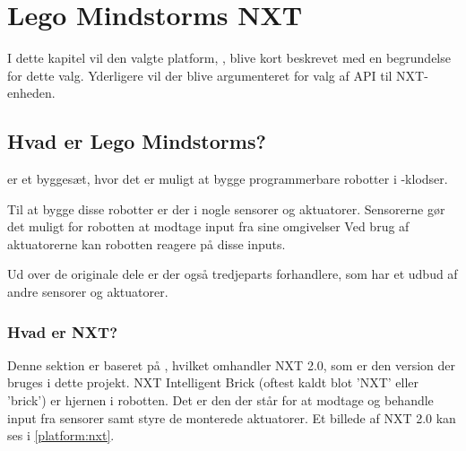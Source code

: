 
\section{Lego Mindstorms NXT}\label{lego:mindstorms-nxt}
I dette kapitel vil den valgte platform, \legoms, blive kort beskrevet med en begrundelse for dette valg.
Yderligere vil der blive argumenteret for valg af API til NXT-enheden.

\subsection{Hvad er Lego Mindstorms?}
\legoms er et byggesæt, hvor det er muligt at bygge programmerbare robotter i \lego-klodser.

Til at bygge disse robotter er der i \legoms nogle sensorer og aktuatorer. Sensorerne gør det muligt for robotten at modtage input fra sine omgivelser
Ved brug af aktuatorerne kan robotten reagere på disse inputs.

Ud over de originale \lego dele er der også tredjeparts forhandlere, som har et udbud af andre sensorer og aktuatorer. 

\subsubsection{Hvad er NXT?}
Denne sektion er baseret på \cite{nxt}, hvilket omhandler NXT 2.0, som er den version der bruges i dette projekt.
NXT Intelligent Brick (oftest kaldt blot 'NXT' eller 'brick') er hjernen i \legoms robotten.
Det er den der står for at modtage og behandle input fra sensorer samt styre de monterede aktuatorer.
Et billede af NXT 2.0 kan ses i \cref{platform:nxt}.

